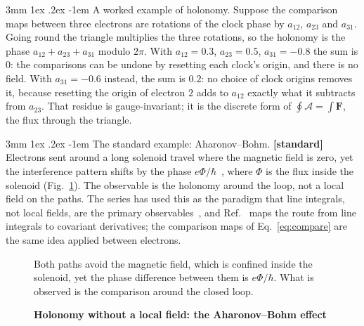 \documentclass[%
 reprint, amsmath,amssymb, aps, prb, ]{revtex4-2}
\makeatletter
\numberwithin{equation}{section}
\renewcommand\paragraph{%
  \@startsection{paragraph}{4}{\z@}%
    {3mm \@plus 1ex \@minus .2ex}
    {-1em}
    {\normalfont\normalsize\itshape}}
\newcommand{\FF}{\mathbf{F}}
\makeatother
\begin{document}
\paragraph{A worked example of holonomy.} Suppose the comparison maps between three electrons are rotations of the clock phase by $a_{12}$, $a_{23}$ and $a_{31}$. Going round the triangle multiplies the three rotations, so the holonomy is the phase $a_{12}+a_{23}+a_{31}$ modulo $2\pi$. With $a_{12}=0.3$, $a_{23}=0.5$, $a_{31}=-0.8$ the sum is $0$: the comparisons can be undone by resetting each clock's origin, and there is no field. With $a_{31}=-0.6$ instead, the sum is $0.2$: no choice of clock origins removes it, because resetting the origin of electron $2$ adds to $a_{12}$ exactly what it subtracts from $a_{23}$. That residue is gauge-invariant; it is the discrete form of $\oint\mathcal{A}=\int\FF$, the flux through the triangle.

\paragraph{The standard example: Aharonov--Bohm.} \textbf{[standard]} Electrons sent around a long solenoid travel where the magnetic field is zero, yet the interference pattern shifts by the phase $e\Phi/\hbar$~\cite{ref:ab59,ref:tonomura86}, where $\Phi$ is the flux inside the solenoid (Fig.~\ref{fig:ab}). The observable is the holonomy around the loop, not a local field on the paths. The series has used this as the paradigm that line integrals, not local fields, are the primary observables~\cite{ref:p29,ref:p30,ref:p31}, and Ref.~\cite{ref:p63} maps the route from line integrals to covariant derivatives; the comparison maps of Eq.~\eqref{eq:compare} are the same idea applied between electrons.

\begin{figure}[t!]
\centering
{}
\caption{\textbf{Holonomy without a local field: the Aharonov--Bohm effect}}
\label{fig:ab}
\vspace{0.4em}
\begin{minipage}{0.95\columnwidth}
\justifying\small
Both paths avoid the magnetic field, which is confined inside the solenoid, yet the phase difference between them is $e\Phi/\hbar$. What is observed is the comparison around the closed loop.
\end{minipage}
\end{figure}
\end{document}
